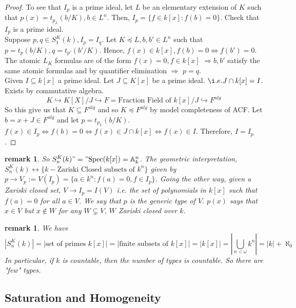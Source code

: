 \documentclass[letterpaper, 12pt]{article}
\newcommand{\fin}{\qquad \quad \hfill \framebox[1.75mm][l]{\,}}
\newcommand{\bA}{\mathbb{A}}
\theoremstyle{stdthm}
\theoremstyle{stddef}
\newtheorem{rem}[thm]{remark} %
\theoremstyle{stdnonum}
\theoremstyle{stdqands}
\theoremstyle{stdbold}
\begin{document}
\begin{proof}
To see that $I_p$ is a prime ideal, let $L$ be an elementary extension of $K$ such that $p(x) = t_{p_L}(b/K), b \in L^n$. Then, $I_p = \{f \in k[x]: f(b) = 0\}$. Check that $I_p$ is a prime ideal.\\

 Suppose $p,q \in S_1^K(k), I_p = I_q$. Let $K \preceq L, b,b' \in L^n$ such that $p = t_p (b/K), q = t_{p'}(b'/K)$. Hence, $f(x) \in k[x], f(b) = 0 \Leftrightarrow f(b') = 0$.  The atomic $L_K$ formulas are of the form $f(x) = 0, f \in k[x]$ $\Rightarrow b,b'$ satisfy the same atomic formulas and by quantifier elimination $\Rightarrow$ $p=q$. \\

 Given $I \subseteq k[x]$ a prime ideal. Let $J \subseteq K[x]$ be a prime ideal. $\i.e. J\cap k[x] = I$.  Exists by commutative algebra. 
\[ K \hookrightarrow K[X] /J \hookrightarrow F = \mbox{Fraction Field of } k[x]/J \hookrightarrow F^{alg} \]
So this give us that $K \subseteq F^{alg}$ and so $K\preceq F^{alg}$ by model completeness of ACF. Let $b = x + J \in F^{alg}$ and let $ p = t_{p_L}(b/K)$. $f(x) \in I_p \Leftrightarrow f(b) = 0 \Leftrightarrow f(x) \in J \cap k[x] \Leftrightarrow f(x) \in I$. Therefore, $I = I_p$. 
\end{proof}

\begin{rem}
So $S_n^K(k) "=" \mbox{Spec}(k[x]) = \bA^n_k$. The geometric interpretation, $S_n^K(k) \leftrightarrow \{ k - \mbox{Zariski Closed subsets of } k^n \}$ given by $p \to V_p := V(I_p) = \{a \in k^n: f(a) = 0, f \in I_p\}$. Going the other way, given a Zariski closed set, $V \to I_p = I(V)$ i.e. the set of polynomials in $k[x]$ such that $f(a) =0$ for all $a \in V$. We say that $p$ is the generic type of $V$. $p(x)$ says that $x \in V$ but $x \notin W$ for any $W \subsetneq V$, $W$ Zariski closed over $k$. 
\end{rem}

\begin{rem}
We have  
\[ |S_n^K(k)| = | \mbox{set of primes } k[x]| = | \mbox{finite subsets of } k[x] | = |k[x]| = \left| \bigcup_{n < \omega}k^n\right| = |k| + \aleph_0 \]
In particular, if $k$ is countable, then the number of types is countable. So there are "few" types. 
\end{rem}


\subsection{Saturation and Homogeneity}
\end{document}
